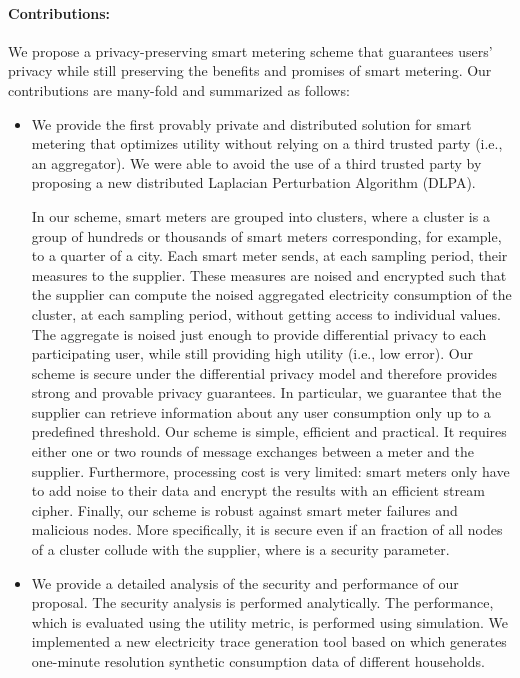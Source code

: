 \documentclass[11pt,a4paper]{article}
\theoremstyle{plain}
\theoremstyle{plain}
\theoremstyle{plain}
\theoremstyle{plain}
\theoremstyle{nonumberplain} \theoremseparator{}
\begin{document}
\paragraph{Contributions:}
We propose a privacy-preserving smart metering scheme that guarantees users' privacy 
while still preserving the benefits and promises of smart metering.
Our contributions are many-fold and summarized as follows:
\begin{itemize}
\item We provide the first provably private and distributed solution for smart metering that
optimizes utility without relying on a third trusted party (i.e., an 
aggregator). 
We were able to avoid the use of a third trusted party by proposing a new distributed 
Laplacian Perturbation Algorithm (DLPA). 

In our scheme, smart meters are grouped into clusters, where a cluster is a group of hundreds 
or thousands of smart meters corresponding, for example,  to a quarter of a city. Each smart meter sends, at each sampling
period, their measures to the supplier. 
These measures are noised and encrypted such that the supplier can compute
the noised aggregated electricity consumption of the cluster, at each sampling period, without getting access to 
individual values.  The aggregate is noised just enough to provide differential privacy to each participating user,  
while still providing high utility (i.e., low error).
Our scheme is secure under the differential privacy model
and therefore provides strong and provable privacy guarantees. 
In particular, we guarantee that the supplier can retrieve information about any user consumption only up to a predefined threshold. Our scheme is simple, efficient and practical. It requires either one or two rounds of message exchanges
between a meter and the supplier. Furthermore, processing cost is very limited:  smart meters only have 
to add noise to their data and encrypt the results with an efficient stream cipher. Finally, our scheme is robust against
smart meter failures and malicious nodes. More specifically, it is secure even if an  fraction of all nodes 
of a cluster collude with the supplier, where  is a security parameter.

\item We provide a detailed analysis of the security and performance of our proposal.
The security analysis is performed analytically. The performance, which is evaluated using
the utility metric, is performed using simulation. We implemented
a new electricity trace generation tool based on \cite{richardson10} which generates one-minute resolution synthetic consumption data of different households. 

\end{itemize}
\end{document}
